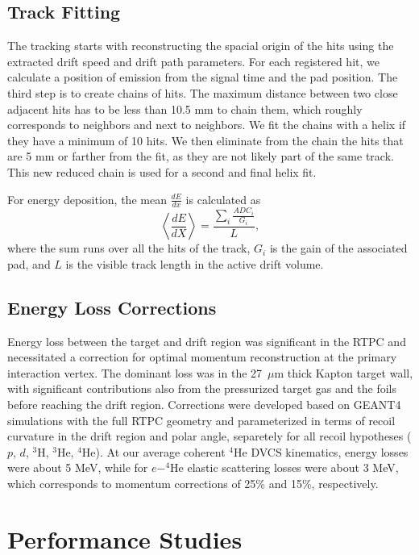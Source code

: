 \documentclass[preprint,5p]{elsarticle}
\begin{document}
\subsection{Track Fitting}\label{sec_rec}

The tracking starts with reconstructing the spacial origin of the hits using the extracted drift speed and drift path 
parameters. For each registered hit, we calculate a position of emission from 
the signal time and the pad position. The third step 
is to create chains of hits. The maximum distance between two close adjacent 
hits has to be less than 10.5 mm to chain them, which roughly corresponds to 
neighbors and next to neighbors. We fit the chains with a helix if they have a minimum of 
10 hits. We then eliminate from the chain the hits that are 5 mm or farther from the fit,
as they are not likely part of the same track.
This new reduced chain is used for a second and final helix fit.

For energy deposition, the mean $\frac{dE}{dx}$ is calculated as
\begin{equation}
 \left\langle \frac{dE}{dX} \right\rangle= \frac{\sum\limits_{i} \frac{ADC_{i}}{G_i}}{L},
\end{equation}
where the sum runs over all the hits of the track, $G_{i}$ is the gain of 
the associated pad, and $L$ is the visible track length in the active drift 
volume. 

\subsection{Energy Loss Corrections}\label{sec_eloss}
Energy loss between the target and drift region was significant in the RTPC and 
necessitated a correction for optimal momentum reconstruction at the primary 
interaction vertex.  The dominant loss was in the 27~$\mu$m thick Kapton target 
wall, with significant contributions also from the pressurized target gas and 
the foils before reaching the drift region.  Corrections were developed based 
on GEANT4 simulations with the full RTPC geometry and parameterized in terms of 
recoil curvature in the drift region and polar angle, separetely for all recoil 
hypotheses ($p$, $d$, $^3$H, $^3$He, $^4$He).  At our average coherent $^4$He 
DVCS kinematics, energy losses were about 5 MeV, while for $e-^4$He elastic 
scattering losses were about 3 MeV, which corresponds to momentum corrections 
of 25\% and 15\%, respectively.

\section{Performance Studies}\label{sec_perfor}
\end{document}
